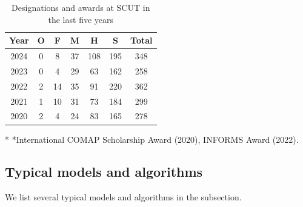\documentclass[12pt]{article}  %
\begin{document}
 
 \begin{table}[htbp]
     \begin{center}		
         \caption{Designations and awards at SCUT in the last five years}
                 \begin{tabular}{ccccccc} %
             \toprule[2pt]
             \multicolumn{1}{m{2cm}}{\centering Year}
             &\multicolumn{1}{m{1cm}}{\centering O}	&\multicolumn{1}{m{1cm}}{\centering F}	&\multicolumn{1}{m{1cm}}{\centering M}	&\multicolumn{1}{m{1cm}}{\centering H}	&\multicolumn{1}{m{1cm}}{\centering S}&\multicolumn{1}{m{2cm}}{\centering Total}\\  %
             \midrule
                 2024   & 0 & 8 & 37 & 108 & 195 &348\\
             2023   & 0 & 4 & 29 & 63 & 162 &258\\
             2022   & 2 & 14 & 35 & 91 & 220 &362\\
             2021   & 1 & 10 & 31 & 73 & 184 &299\\
             2020   & 2 & 4 & 24 & 83 & 165 &278\\
             \bottomrule[2pt]
         \end{tabular}	\label{tab3} %
                 \begin{tablenotes}
             \footnotesize
             \item[*] *International COMAP Scholarship Award (2020), INFORMS Award (2022). %
         \end{tablenotes} 
     \end{center}
 \end{table} 
 
  
 \subsection{Typical models and algorithms}
 
 We list several typical models and algorithms in the subsection.
 
\end{document}
